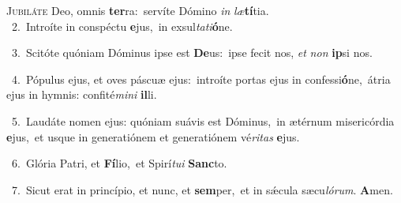 \lettrine{\initial\textcolor{\initialcolor}{J}}{ubiláte} Deo, omnis \textbf{ter}\-ra:~\star servíte Dómino \textit{in} \textit{læ}\-\textbf{tí}tia.\\
{\numbfont\textcolor{\numbcolor}{~2.}}~Introíte in conspéctu \textbf{e}\-jus,~\star in exsul\-\textit{ta}\-\textit{ti}\textbf{ó}ne.\par
{\numbfont\textcolor{\numbcolor}{~3.}}~Scitóte quóniam Dóminus ipse est \textbf{De}\-us:~\star ipse fecit nos, \textit{et} \textit{non} \textbf{ip}\-si nos.\par
{\numbfont\textcolor{\numbcolor}{~4.}}~Pópulus ejus, et oves páscuæ ejus:~\dagger introíte portas ejus in confessi\-\textbf{ó}\-ne,~\star átria ejus in hymnis: confité\-\textit{mi}\-\textit{ni} \textbf{il}\-li.\par
{\numbfont\textcolor{\numbcolor}{~5.}}~Laudáte nomen ejus: quóniam suávis est Dóminus,~\dagger in ætérnum misericórdia \textbf{e}\-jus,~\star et usque in generatiónem et generatiónem vé\-\textit{ri}\-\textit{tas} \textbf{e}\-jus.\par
{\numbfont\textcolor{\numbcolor}{~6.}}~Glória Patri, et \textbf{Fí}\-lio,~\star et Spirí\-\textit{tu}\-\textit{i} \textbf{Sanc}\-to.\par
{\numbfont\textcolor{\numbcolor}{~7.}}~Sicut erat in princípio, et nunc, et \textbf{sem}\-per,~\star et in sǽcula sæcu\-\textit{ló}\-\textit{rum}. \textbf{A}\-men.\par
